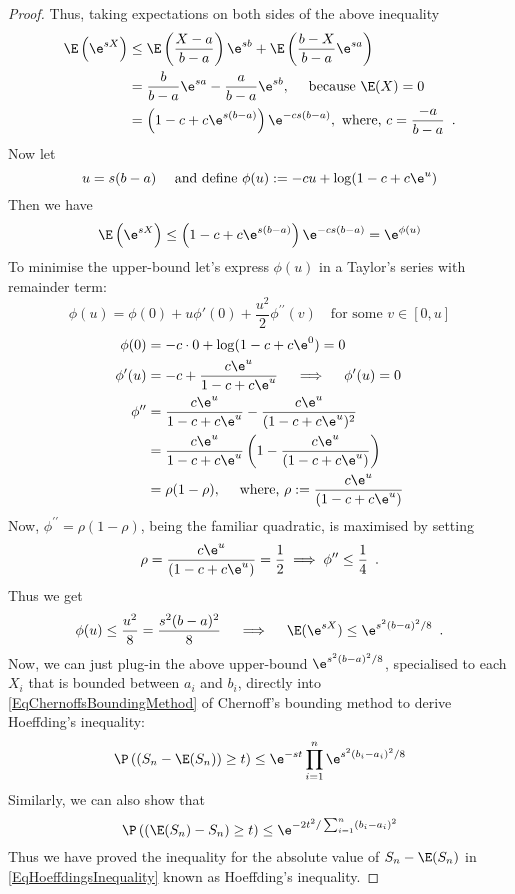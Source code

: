 \begin{proof}
Thus, taking expectations on both sides of the above inequality
\begin{align*}
\E \left( \e^{sX}\right) 
&\leq
\E\left( \frac{X-a}{b-a}\right) \e^{sb} +   \E \left( \frac{b-X}{b-a} \e^{sa} \right)\\
&= \frac{b}{b-a} \e^{sa} - \frac{a}{b-a} \e^{sb}, \quad \text{ because } \E(X)=0\\
&= \left( 1 - c + c \e^{s(b-a)} \right) \e^{-c s(b-a)}, \text{ where, } c=\frac{-a}{b-a}\enspace.
\end{align*}
Now let
\[
u=s(b-a) \quad \text{ and define } \phi(u) := -c u + \log(1-c+c\e^u)
\]
Then we have
\[
\E \left( \e^{sX} \right) \leq \left( 1-c+c\e^{s(b-a)}\right) \e^{- c s (b-a)} = \e^{\phi(u)}
\]
To minimise the upper-bound let's express $\phi(u)$ in a Taylor's series with remainder term:
\[
\phi(u) = \phi(0) + u \phi'(0) + \frac{u^2}{2} \phi^{\prime\prime}(v) \quad \text{for some } v \in [0,u]
\]
\begin{align*}
\phi(0)
&= -c \cdot 0 + \log(1-c+c \e^0) = 0 \\
\phi'(u)
&= -c + \frac{c \e^u}{1-c+c\e^u} \quad \implies \quad \phi'(u)=0 \\
\phi^{\prime \prime}
&= \frac{c \e^u}{1-c+c\e^u} - \frac{c\e^u}{(1-c+c\e^u)^2}\\
&= \frac{c \e^u}{1-c+c\e^u} \left(1 - \frac{c\e^u}{(1-c+c\e^u)} \right)\\
&= \rho(1-\rho), \quad \text{ where, } \rho := \frac{c\e^u}{(1-c+c\e^u)}  
\end{align*}
Now, $\phi^{\prime\prime}=\rho(1-\rho)$, being the familiar quadratic, is maximised by setting
\[
\rho = \frac{c\e^u}{(1-c+c\e^u)} = \frac{1}{2} \implies \phi^{\prime\prime} \leq \frac{1}{4} \enspace .
\]
Thus we get
\[
\phi(u) \leq \frac{u^2}{8} = \frac{s^2(b-a)^2}{8} \quad \implies \quad \E(\e^{sX}) \leq \e^{s^2(b-a)^2/8} \enspace .
\]
Now, we can just plug-in the above upper-bound $\e^{s^2(b-a)^2/8}$, specialised to each $X_i$ that is bounded between $a_i$ and $b_i$, directly into \eqref{EqChernoffsBoundingMethod} of Chernoff's bounding method 
to derive Hoeffding's inequality:
\begin{align*}
\P \left( (S_n - \E(S_n)) \geq t \right) 
&\leq \e^{-st} \prod_{i=1}^n \e^{s^2(b_i-a_i)^2/8} \\
\end{align*}
Similarly, we can also show that
\[
\P \left( (\E(S_n) - S_n) \geq t \right) \leq \e^{-2t^2/\sum_{i=1}^n (b_i-a_i)^2}
\]
Thus we have proved the inequality for the absolute value of $S_n - \E(S_n)$ in \eqref{EqHoeffdingsInequality} known as Hoeffding's inequality. 
\end{proof}

